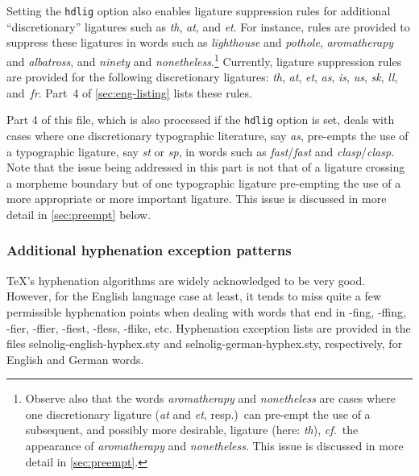 \documentclass[12pt]{article}
\newcommand{\pkg}[1]{\textsf{#1}}
\newcommand{\opt}[1]{\texttt{#1}}
\begin{document}
Setting the \opt{hdlig} option also enables ligature suppression rules for additional \enquote{discretionary} ligatures such as \emph{th}, \emph{at}, and \emph{et}. For instance, rules are provided to suppress these ligatures in words such as \emph{ligh\mbox{th}ouse} and \emph{po\mbox{th}ole}, \emph{arom\mbox{at}herapy} and \emph{alb\mbox{at}ross}, and \emph{nin\mbox{et}y} and \emph{non\mbox{et}heless}.\footnote{Observe also that the words \emph{arom\mbox{at}herapy} and \emph{nonetheless} are cases where one discretionary ligature (\emph{at} and \emph{et}, resp.)\ can pre-empt the use of a subsequent, and possibly more desirable, ligature (here: \emph{th}), \emph{cf.}\ the appearance of \emph{aroma\breaklig therapy} and \emph{none\breaklig theless}. This issue is discussed in more detail in \cref{sec:preempt}.} Currently, ligature suppression rules are provided for the following discretionary ligatures: \emph{th}, \emph{at}, \emph{et}, \emph{as}, \emph{is}, \emph{us},  {\ebg \emph{sk}},  \emph{ll}, and~\emph{fr}. Part~4 of \cref{sec:eng-listing} lists these rules.

Part 4 of this file, which is also processed if the \opt{hdlig} option is set, deals with cases where one discretionary typographic literature, say \emph{as}, pre-empts the use of a typographic ligature, say \emph{st} or \emph{sp}, in words such as \emph{f\mbox{as}t}\slash \emph{fa\mbox{st}} and \emph{cl\mbox{as}p}\slash \emph{cla\mbox{sp}}. Note that the issue being addressed in this part is not that of a ligature crossing a morpheme boundary but of one typographic ligature pre-empting the use of a more appropriate or more important ligature. This issue is discussed in more detail in \cref{sec:preempt} below.



\subsubsection{Additional hyphenation exception patterns} \label{sec:addlhyph}

\TeX's hyphenation algorithms are widely acknowledged to be very good. However, for the English language case at least, it tends to miss quite a few permissible hyphenation points when dealing with words that end in -fing, -\mbox{ffi}ng, -fier, -\mbox{ffi}er, -fiest, -\mbox{fl}ess, -\mbox{fl}ike, etc. Hyphenation exception lists are provided in the files \pkg{selnolig-english-hyphex.sty} and \pkg{selnolig-german-hyphex.sty}, respectively, for English and German words.
\end{document}
